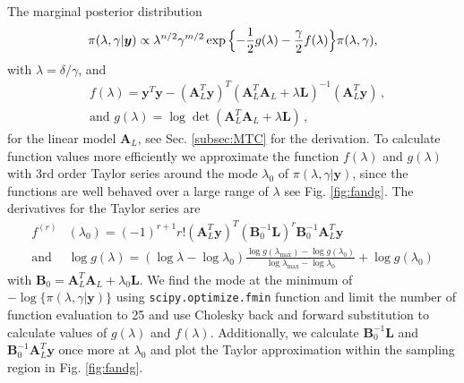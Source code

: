 The marginal posterior distribution 
\begin{align}
	\pi(\lambda, \gamma | \bm{y})
	\propto  \lambda^{n/2} \gamma^{m/2}   \exp{ \Bigl\{ - \frac{1}{2} g ( \lambda) - \frac{\gamma}{2} f ( \lambda) \Bigr\} } \pi(\lambda, \gamma),
	\label{eq:MargPostAppl}
\end{align}
with $\lambda = \delta / \gamma$, and
\begin{subequations}
	\label{eq:fandg}
	\begin{align}
		&f ( \lambda) = \bm{y}^T \bm{y} - (\bm{A}_L^T \bm{y})^T (\bm{A}_L^T  \bm{A}_L + \lambda \bm{L})^{-1} (\bm{A}_L^T \bm{y})  \, ,  \\
		&\text{and } g(\lambda) = \log \det (\bm{A}_L^T  \bm{A}_L + \lambda \bm{L}) \, ,
	\end{align}
\end{subequations}
for the linear model $\bm{A}_L$, see Sec. \ref{subsec:MTC} for the derivation.
To calculate function values more efficiently we approximate the function $f(\lambda)$ and $g(\lambda)$ with 3rd order Taylor series around the mode $\lambda_0$ of $\pi(\lambda, \gamma | \bm{y})$, since the functions are well behaved over a large range of $\lambda$ see Fig. \ref{fig:fandg}.
The derivatives for the Taylor series are
\begin{align}
	f^{(r)}& (\lambda_0)= (-1)^{r+1} r! (\bm{A}_L^T \bm{y})^T (\bm{B}_0^{-1} \bm{L})^r \bm{B}_0^{-1} \bm{A}_L^T \bm{y} \label{eq:ftay}  \\
	\text{and } & \log{ g(\lambda)} = (\log{\lambda} - \log{\lambda_{0}})  \frac{ \log{g(\lambda_{\text{max}})} - \log{g(\lambda_{0})} }{\log{\lambda_{\text{max}}} - \log{\lambda_{0}} } + \log{ g(\lambda_{0})} 
	\label{eq:gtay}
\end{align} 
with $\bm{B}_0 = \bm{A}_L^T  \bm{A}_L + \lambda_0 \bm{L}$.
We find the mode at the minimum of  $-\log\{ \pi(\lambda, \gamma | \bm{y}) \}$  using \texttt{scipy.optimize.fmin} function and limit the number of function evaluation to 25 and use Cholesky back and forward substitution to calculate values of $g(\lambda)$ and $f(\lambda)$.
Additionally, we calculate $\bm{B}_0^{-1} \bm{L} $ and  $\bm{B}_0^{-1}  \bm{A}_L^T \bm{y}$ once more at $\lambda_0$ and plot the Taylor approximation within the sampling region in Fig. \ref{fig:fandg}.
